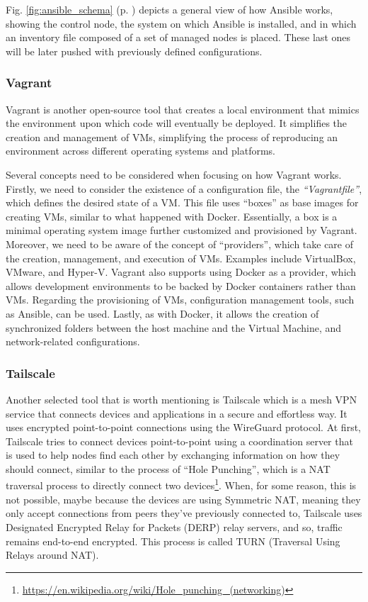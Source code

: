 Fig. \ref{fig:ansible_schema} (p. \pageref{fig:ansible_schema}) depicts a general view of how Ansible works, showing the control node, the system on which Ansible is installed, and in which an inventory file composed of a set of managed nodes is placed. These last ones will be later pushed with previously defined configurations.

\subsubsection{Vagrant} \label{sec:selected_tools_vagrant}

Vagrant is another open-source tool that creates a local environment that mimics the environment upon which code will eventually be deployed. It simplifies the creation and management of VMs, simplifying the process of reproducing an environment across different operating systems and platforms.

Several concepts need to be considered when focusing on how Vagrant works. Firstly, we need to consider the existence of a configuration file, the \textit{``Vagrantfile''}, which defines the desired state of a VM. This file uses ``boxes'' as base images for creating VMs, similar to what happened with Docker. Essentially, a box is a minimal operating system image further customized and provisioned by Vagrant. Moreover, we need to be aware of the concept of ``providers'', which take care of the creation, management, and execution of VMs. Examples include VirtualBox, VMware, and Hyper-V. Vagrant also supports using Docker as a provider, which allows development environments to be backed by Docker containers rather than VMs. Regarding the provisioning of VMs, configuration management tools, such as Ansible, can be used. Lastly, as with Docker, it allows the creation of synchronized folders between the host machine and the Virtual Machine, and network-related configurations.

\subsubsection{Tailscale} \label{sec:selected_tools_tailscale}

Another selected tool that is worth mentioning is Tailscale which is a mesh VPN service that connects devices and applications in a secure and effortless way. It uses encrypted point-to-point connections using the WireGuard protocol. At first, Tailscale tries to connect devices point-to-point using a coordination server that is used to help nodes find each other by exchanging information on how they should connect, similar to the process of ``Hole Punching'', which is a NAT traversal process to directly connect two devices\footnote{\url{https://en.wikipedia.org/wiki/Hole_punching_(networking)}}. When, for some reason, this is not possible, maybe because the devices are using Symmetric NAT, meaning they only accept connections from peers they've previously connected to, Tailscale uses Designated Encrypted Relay for Packets (DERP) relay servers, and so, traffic remains end-to-end encrypted. This process is called TURN (Traversal Using Relays around NAT).

